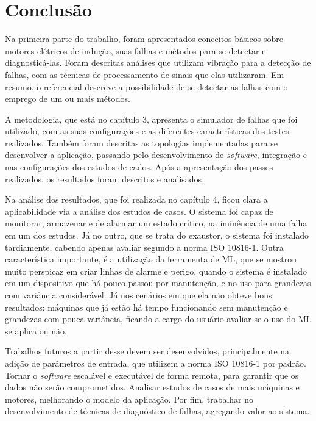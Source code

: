 
\chapter[Conclusão]{Conclusão}

Na primeira parte do trabalho, foram apresentados conceitos básicos sobre motores elétricos de indução, suas falhas e métodos para se 
detectar e diagnosticá-las. Foram descritas análises que utilizam vibração para a detecção de falhas, com as
técnicas de processamento de sinais que elas utilizaram. Em resumo, o referencial descreve a possibilidade de se detectar
as falhas com o emprego de um ou mais métodos.

A metodologia, que está no capítulo 3, apresenta o simulador de falhas que foi utilizado, com as suas configurações e as
diferentes características dos testes realizados. Também foram descritas as topologias implementadas para se desenvolver a aplicação, passando 
pelo desenvolvimento de \textit{software}, integração e nas configurações dos estudos de cados. 
Após a apresentação dos passos realizados, os resultados foram descritos e analisados.

Na análise dos resultados, que foi realizada no capítulo 4, ficou clara a aplicabilidade via a análise dos estudos de casos. O sistema foi
capaz de monitorar, armazenar e de alarmar um estado crítico, na iminência de uma falha em um dos estudos. Já no outro, que se trata do exaustor,
o sistema foi instalado tardiamente, cabendo apenas avaliar segundo a norma ISO 10816-1. Outra característica importante, é a utilização da
ferramenta de ML, que se mostrou muito perspicaz em criar linhas de alarme e perigo, quando o sistema é instalado em um dispositivo
que há pouco passou por manutenção, e no uso para grandezas com variância considerável. Já nos cenários em que ela não obteve bons resultados:
máquinas que já estão há tempo funcionando sem manutenção e grandezas com pouca variância, ficando a cargo do usuário avaliar se o uso do 
ML se aplica ou não. 

Trabalhos futuros a partir desse devem ser desenvolvidos, principalmente na adição de parâmetros de entrada, que utilizem a norma ISO 10816-1
por padrão. Tornar o \textit{software} escalável e executável de forma remota, para garantir que os dados não serão comprometidos. Analisar estudos de 
casos de mais máquinas e motores, melhorando o modelo da aplicação. Por fim, trabalhar no desenvolvimento de técnicas de diagnóstico de falhas,
agregando valor ao sistema. 




